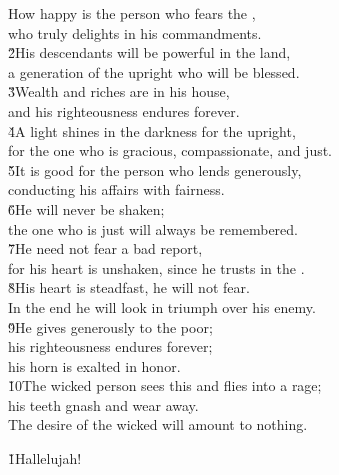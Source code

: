 \begin{poetry}
\poeml How happy is the person who fears the , \\
\poemll    who truly delights in his commandments. \\
\poeml \v{2}His descendants will be powerful in the land, \\
\poemll    a generation of the upright who will be blessed. \\
\poeml \v{3}Wealth and riches are in his house, \\
\poemll    and his righteousness endures forever. \\
\poeml \v{4}A light shines in the darkness for the upright, \\
\poemll    for the one who is gracious, compassionate, and just. \\
\poeml \v{5}It is good for the person who lends generously, \\
\poemll    conducting his affairs with fairness. \\
\poeml \v{6}He will never be shaken; \\
\poemll    the one who is just will always be remembered. \\
\poeml \v{7}He need not fear a bad report, \\
\poemll    for his heart is unshaken, since he trusts in the . \\
\poeml \v{8}His heart is steadfast, he will not fear. \\
\poemll    In the end he will look in triumph over his enemy. \\
\poeml \v{9}He gives generously to the poor; \\
\poemll    his righteousness endures forever; \\
\poemlll       his horn is exalted in honor. \\
\poeml \v{10}The wicked person sees this and flies into a rage; \\
\poemll    his teeth gnash and wear away. \\
\poeml The desire of the wicked will amount to nothing.
\end{poetry}

\begin{poetry}
\poeml \v{1}Hallelujah!
\end{poetry}

